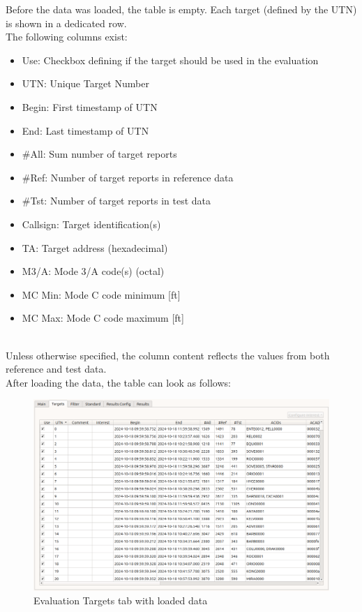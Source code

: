 Before the data was loaded, the table is empty. Each target (defined by the UTN) is shown in a dedicated row. \\

The following columns exist:

\begin{itemize}  
\item Use: Checkbox defining if the target should be used in the evaluation
\item UTN: Unique Target Number
\item Begin: First timestamp of UTN
\item End: Last timestamp of UTN
\item \#All: Sum number of target reports
\item \#Ref: Number of target reports in reference data
\item \#Tst: Number of target reports in test data
\item Callsign: Target identification(s)
\item TA: Target address (hexadecimal)
\item M3/A: Mode 3/A code(s) (octal)
\item MC Min: Mode C code minimum [ft]
\item MC Max: Mode C code maximum [ft]
\end{itemize}
\ \\

Unless otherwise specified, the column content reflects the values from both reference and test data. \\

After loading the data, the table can look as follows:

\begin{figure}[H]
  \hspace*{-2cm}
    \includegraphics[width=18cm,frame]{figures/eval_targets_loaded.png}
  \caption{Evaluation Targets tab with loaded data}
\end{figure}

